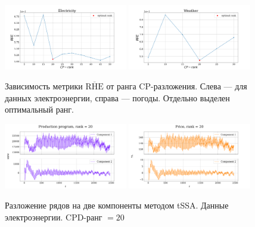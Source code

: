 		\begin{figure}[h!]
			\centering
			\includegraphics[width=0.48\textwidth, keepaspectratio]{../experiments/electricity/tssa/figs/decomposition/RHE_mean.png}
			\includegraphics[width=0.48\textwidth, keepaspectratio]{../experiments/weather/tssa/figs/decomposition/RHE_mean.png}
			\caption{Зависимость метрики $ \overline{\text{RHE}} $ от ранга CP-разложения. Слева --- для данных электроэнергии, справа --- погоды. Отдельно выделен оптимальный ранг.}\label{fig:decomp_rhe_rank}
		\end{figure}
		
		\begin{figure}[h!]
			\centering
			\includegraphics[width=0.48\textwidth, keepaspectratio]{../experiments/electricity/tssa/figs/decomposition/cpd_rank_20/Production_program.png}
			\includegraphics[width=0.48\textwidth, keepaspectratio]{../experiments/electricity/tssa/figs/decomposition/cpd_rank_20/Price.png}
			\caption{Разложение рядов на две компоненты методом tSSA. Данные электроэнергии. CPD-ранг $ = 20 $}\label{fig:electr_decomp_tssa}
		\end{figure}
		
